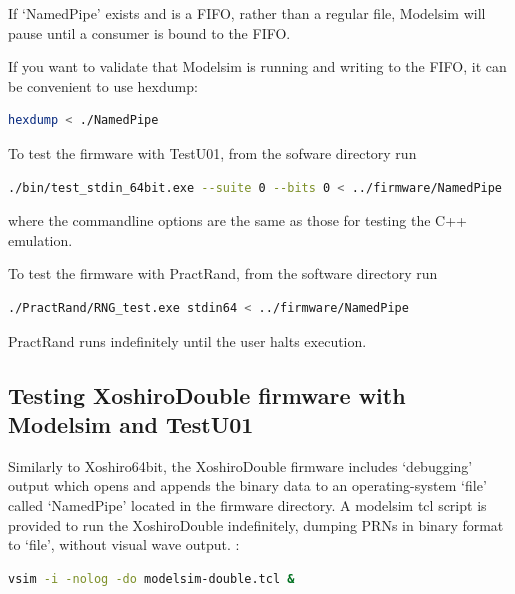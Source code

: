 \documentclass{article}
\begin{document}
If `NamedPipe' exists and is a FIFO, rather than a regular file, Modelsim will pause until a consumer is bound to the FIFO.

If you want to validate that Modelsim is running and writing to the FIFO, it can be convenient to use hexdump:

\begin{minipage}{1.0\textwidth}
\centering
\begin{lstlisting}[language=bash, label=lst:HexDumpPipe]
hexdump < ./NamedPipe
\end{lstlisting}
\end{minipage}

To test the firmware with TestU01, from the sofware directory run 

\begin{minipage}{1.0\textwidth}
\centering
\begin{lstlisting}[language=bash, label=lst:TestU01Pipe]
./bin/test_stdin_64bit.exe --suite 0 --bits 0 < ../firmware/NamedPipe
\end{lstlisting}
\end{minipage}

where the commandline options are the same as those for testing the C++ emulation.

To test the firmware with PractRand, from the software directory run 

\begin{minipage}{1.0\textwidth}
\centering
\begin{lstlisting}[language=bash , label=lst:PractRandPipe]
./PractRand/RNG_test.exe stdin64 < ../firmware/NamedPipe
\end{lstlisting}
\end{minipage}

PractRand runs indefinitely until the user halts execution.

\subsection{Testing XoshiroDouble firmware with Modelsim and TestU01}

Similarly to Xoshiro64bit, the XoshiroDouble firmware includes `debugging' output which opens and appends the binary data to an operating-system `file' called `NamedPipe' located in the firmware directory. A modelsim tcl script is provided to run the XoshiroDouble indefinitely, dumping PRNs in binary format to `file', without visual wave output. :

\begin{minipage}{1.0\textwidth}
\centering
\begin{lstlisting}[language=bash, label=lst:ModelsimDoubleNoGui]
vsim -i -nolog -do modelsim-double.tcl &
\end{lstlisting}
\end{minipage}
\end{document}
